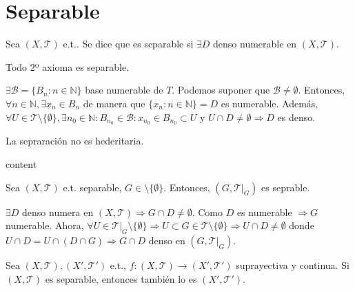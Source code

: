 \section{Separable}

\begin{defn}[Separable]
  Sea $( X, \mathcal{T} )$ e.t.. Se dice que es separable si $\exists D$ denso numerable en $( X, \mathcal{T} )$.
\end{defn}

\begin{prop}
  Todo 2º axioma es separable.
\end{prop}

\begin{dem}
  $\exists \mathcal{B} = \{  B_{n} : n \in \mathbb{N} \}$ base numerable de $T$. Podemos suponer que $\mathcal{B} \neq \emptyset$. Entonces, $\forall n \in \mathbb{N}, \exists x_{n} \in B_{n}$ de manera que $\{ x_{n} : n \in \mathbb{N} \} = D$ es numerable. Además, $\forall U \in \mathcal{T} \setminus \{ \emptyset \}, \exists n_{0} \in \mathbb{N} : B_{n_{0}} \in \mathcal{B} : x_{n_{0}} \in B_{n_{0}}\subset U$ y $U \cap D \neq \emptyset \Rightarrow D$ es denso.
\end{dem}

\begin{obs}
  La sepraración no es hederitaria.
\end{obs}

\begin{dem}
  content
\end{dem}

\begin{prop}
  Sea $( X, \mathcal{T} )$ e.t. separable, $G \in \mathcal{ \setminus \{  \emptyset \}}$. Entonces, $( G, \mathcal{T}|_{G})$ es seprable.
\end{prop}

\begin{dem}
  $\exists D$ denso numera en $( X, \mathcal{T} ) \Rightarrow G \cap D \neq \emptyset$. Como $D$ es numerable $\Rightarrow G$ numerable. Ahora, $\forall U \in \mathcal{T}|_{G} \setminus \{  \emptyset \} \Rightarrow U \subset G \in \mathcal{T} \setminus \{  \emptyset \} \Rightarrow U \cap D \neq \emptyset$ donde $ U \cap D = U \cap (D \cap G) \Rightarrow G \cap D$ denso en $( G, \mathcal{T}|_{G})$.
\end{dem}

\begin{prop}
  Sea $( X, \mathcal{T} ), ( X', \mathcal{T}' )$ e.t., $f: ( X, \mathcal{T} ) \to ( X', \mathcal{T}' )$ suprayectiva y continua. Si $( X, \mathcal{T} )$ es separable, entonces también lo es $( X', \mathcal{T}' )$.
\end{prop}

